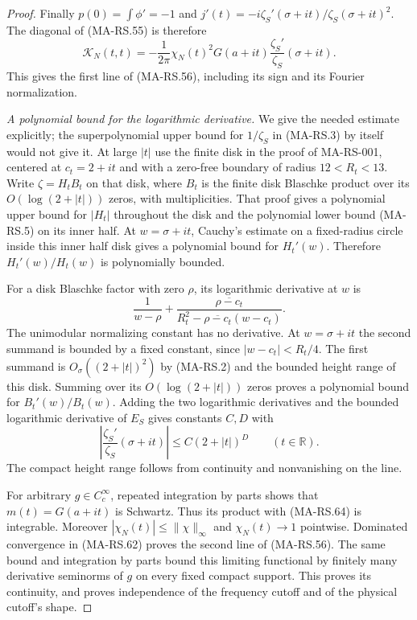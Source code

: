 \begin{proof}
Finally $p(0)=\int\phi'=-1$ and
$j'(t)=-i\zeta_S'(\sigma+it)/\zeta_S(\sigma+it)^2$.
The diagonal of (MA-RS.55) is therefore
\[
 \mathcal K_N(t,t)=
    -\frac1{2\pi}\chi_N(t)^2G(a+it)
                         \frac{\zeta_S'}{\zeta_S}(\sigma+it).
 \tag{MA-RS.62}
\]
This gives the first line of (MA-RS.56), including its sign
and its Fourier normalization.

\emph{A polynomial bound for the logarithmic derivative.}
We give the needed estimate explicitly; the superpolynomial
upper bound for $1/\zeta_S$ in (MA-RS.3) by itself would not
give it. At large $|t|$ use the finite disk in the proof of
MA-RS-001, centered at $c_t=2+it$ and with a zero-free boundary
of radius $12<R_t<13$. Write $\zeta=H_t B_t$ on that disk,
where $B_t$ is the finite disk Blaschke product over its
$O(\log(2+|t|))$ zeros, with multiplicities.
That proof gives a polynomial upper bound for $|H_t|$
throughout the disk and the polynomial lower bound (MA-RS.5)
on its inner half. At $w=\sigma+it$, Cauchy's estimate on a
fixed-radius circle inside this inner half disk gives a
polynomial bound for $H_t'(w)$. Therefore $H_t'(w)/H_t(w)$
is polynomially bounded.

For a disk Blaschke factor with zero $\rho$, its logarithmic
derivative at $w$ is
\[
 \frac1{w-\rho}+
     \frac{\overline{\rho-c_t}}
          {R_t^2-\overline{\rho-c_t}(w-c_t)}.
 \tag{MA-RS.63}
\]
The unimodular normalizing constant has no derivative.
At $w=\sigma+it$ the second summand is bounded by a fixed
constant, since $|w-c_t|<R_t/4$. The first summand is
$O_\sigma((2+|t|)^2)$ by (MA-RS.2) and the bounded height
range of this disk. Summing over its $O(\log(2+|t|))$
zeros proves a polynomial bound for $B_t'(w)/B_t(w)$.
Adding the two logarithmic derivatives and the bounded
logarithmic derivative of $E_S$ gives constants $C,D$ with
\[
 \left|\frac{\zeta_S'}{\zeta_S}(\sigma+it)\right|
              \le C(2+|t|)^D\qquad(t\in\mathbb R).
 \tag{MA-RS.64}
\]
The compact height range follows from continuity and
nonvanishing on the line.

For arbitrary $g\in C_c^\infty$, repeated integration by
parts shows that $m(t)=G(a+it)$ is Schwartz. Thus its product
with (MA-RS.64) is integrable. Moreover
$|\chi_N(t)|\le\|\chi\|_\infty$ and $\chi_N(t)\to1$
pointwise. Dominated convergence in (MA-RS.62) proves the
second line of (MA-RS.56). The same bound and integration
by parts bound this limiting functional by finitely many
derivative seminorms of $g$ on every fixed compact support.
This proves its continuity, and proves independence of
the frequency cutoff and of the physical cutoff's shape.


\end{proof}
